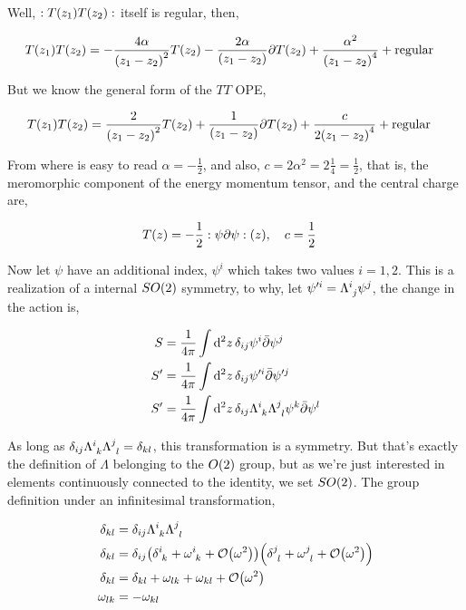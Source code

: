 Well, $:T\qty(z_1)T\qty(z_2):$ itself is regular, then,

\begin{align*}
    { T\qty(z_1)T\qty(z_2)}&=-\frac{4\alpha}{\qty(z_1-z_2)^2}T\qty(z_2)-\frac{2\alpha}{\qty(z_1-z_2)}\partial T\qty(z_2)+\frac{\alpha^2}{\qty(z_1-z_2)^4}+\textnormal{regular}
\end{align*}

But we know the general form of the $TT$ OPE,

\begin{align*}
    { T\qty(z_1)T\qty(z_2)}&=\frac{2}{\qty(z_1-z_2)^2}T\qty(z_2)+\frac{1}{\qty(z_1-z_2)}\partial T\qty(z_2)+\frac{c}{2\qty(z_1-z_2)^4}+\textnormal{regular}
\end{align*}

From where is easy to read $\alpha=-\frac12$, and also, $c=2\alpha^2=2\frac14=\frac12$, that is, the meromorphic component of the 
energy momentum tensor, and the central charge are,

\begin{align*}
    T\qty(z)&=-\frac12\cnord{\psi\partial\psi}\qty(z),\ \ \ c=\frac12
\end{align*}

\probitem{}

Now let $\psi$ have an additional index, $\psi^i$ which takes two values $i=1,2$. This is a realization of a internal $SO\qty(2)$ symmetry, to why, 
let $\psi'^i=\tensor{\Lambda}{^i_j}\psi^j$, the change in the action is,

\begin{align*}
    S&=\frac{1}{4\pi}\int\dd[2]{z}\delta_{ij}\psi^i\bar\partial\psi^j\\
    S'&=\frac{1}{4\pi}\int\dd[2]{z}\delta_{ij}\psi'^i\bar\partial\psi'^j\\
    S'&=\frac{1}{4\pi}\int\dd[2]{z}\delta_{ij}\tensor{\Lambda}{^i_k}\tensor{\Lambda}{^j_l}\psi^k\bar\partial\psi^l
\end{align*}

As long as $\delta_{ij}\tensor{\Lambda}{^i_k}\tensor{\Lambda}{^j_l}=\delta_{kl}$, this transformation is a symmetry. But that's exactly the 
definition of $\Lambda$ belonging to the $O\qty(2)$ group, but as we're just interested in elements continuously connected to the identity, 
we set $SO\qty(2)$. The group definition under an infinitesimal transformation,

\begin{align*}
    \delta_{kl}&=\delta_{ij}\tensor{\Lambda}{^i_k}\tensor{\Lambda}{^j_l}\\
    \delta_{kl}&=\delta_{ij}\qty(\tensor{\delta}{^i_k}+\tensor{\omega}{^i_k}+\mathcal O\qty(\omega^2))\qty(\tensor{\delta}{^j_l}+\tensor{\omega}{^j_l}+\mathcal O\qty(\omega^2))\\
    \delta_{kl}&=\delta_{kl}+\omega_{lk}+\omega_{kl}+\mathcal O\qty(\omega^2)\\
    \omega_{lk}&=-\omega_{kl}
\end{align*}

